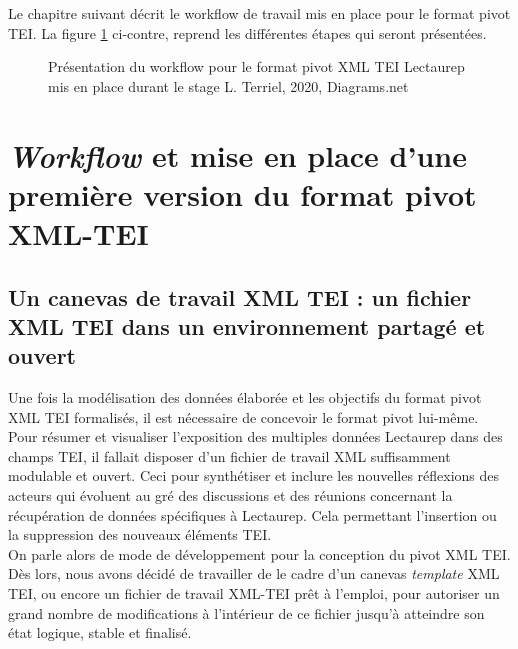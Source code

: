 Le chapitre suivant décrit le workflow de travail mis en place pour le format pivot TEI. La figure \ref{fig:workflow_tei_pivot_lectaurep} ci-contre, reprend les différentes étapes qui seront présentées.
\begin{figure}[h]
    \centering
    \centerline{}
    \caption{Présentation du workflow pour le format pivot XML TEI Lectaurep mis en place durant le stage  \textcopyright L. Terriel, 2020, Diagrams.net}
    \label{fig:workflow_tei_pivot_lectaurep}
\end{figure}

\clearpage
\thispagestyle{empty}

\chapter{\textit{Workflow} et mise en place d'une première version du format pivot XML-TEI}
\section{Un canevas de travail XML TEI : un fichier XML TEI dans un environnement partagé et ouvert}
Une fois la modélisation des données élaborée et les objectifs du format pivot XML TEI formalisés, il est nécessaire de concevoir le format pivot lui-même. 
Pour résumer et visualiser l'exposition des multiples données Lectaurep dans des champs TEI, il fallait disposer d'un fichier de travail XML suffisamment modulable et ouvert.
Ceci pour synthétiser et inclure les nouvelles réflexions des acteurs qui évoluent au gré des discussions et des réunions concernant la récupération de données spécifiques à Lectaurep. Cela permettant l'insertion ou la suppression des nouveaux éléments TEI.\\

On parle alors de mode de développement  pour la conception du pivot XML TEI. Dès lors, nous avons décidé de travailler de le cadre d'un canevas \textit{template} XML TEI, ou encore un fichier de travail XML-TEI prêt à l'emploi, pour autoriser un grand nombre de modifications à l'intérieur de ce fichier jusqu'à atteindre son état logique, stable et finalisé.\\

